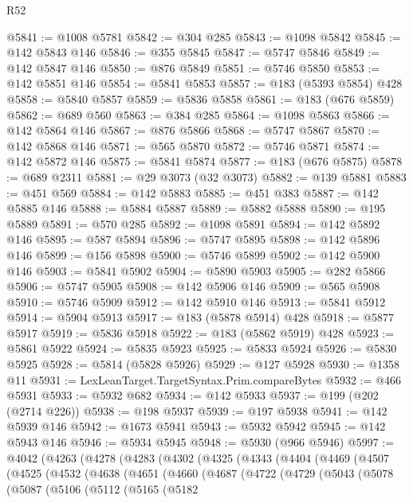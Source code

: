 \begin{lexlean}{R52}
\begin{coremodule}
@5841 := @1008 @5781
@5842 := @304 @285
@5843 := @1098 @5842
@5845 := @142 @5843 @146
@5846 := @355 @5845
@5847 := @5747 @5846
@5849 := @142 @5847 @146
@5850 := @876 @5849
@5851 := @5746 @5850
@5853 := @142 @5851 @146
@5854 := @5841 @5853
@5857 := @183 (@5393 @5854) @428
@5858 := @5840 @5857
@5859 := @5836 @5858
@5861 := @183 (@676 @5859)
@5862 := @689 @560
@5863 := @384 @285
@5864 := @1098 @5863
@5866 := @142 @5864 @146
@5867 := @876 @5866
@5868 := @5747 @5867
@5870 := @142 @5868 @146
@5871 := @565 @5870
@5872 := @5746 @5871
@5874 := @142 @5872 @146
@5875 := @5841 @5874
@5877 := @183 (@676 @5875)
@5878 := @689 @2311
@5881 := @29 @3073 (@32 @3073)
@5882 := @139 @5881
@5883 := @451 @569
@5884 := @142 @5883
@5885 := @451 @383
@5887 := @142 @5885 @146
@5888 := @5884 @5887
@5889 := @5882 @5888
@5890 := @195 @5889
@5891 := @570 @285
@5892 := @1098 @5891
@5894 := @142 @5892 @146
@5895 := @587 @5894
@5896 := @5747 @5895
@5898 := @142 @5896 @146
@5899 := @156 @5898
@5900 := @5746 @5899
@5902 := @142 @5900 @146
@5903 := @5841 @5902
@5904 := @5890 @5903
@5905 := @282 @5866
@5906 := @5747 @5905
@5908 := @142 @5906 @146
@5909 := @565 @5908
@5910 := @5746 @5909
@5912 := @142 @5910 @146
@5913 := @5841 @5912
@5914 := @5904 @5913
@5917 := @183 (@5878 @5914) @428
@5918 := @5877 @5917
@5919 := @5836 @5918
@5922 := @183 (@5862 @5919) @428
@5923 := @5861 @5922
@5924 := @5835 @5923
@5925 := @5833 @5924
@5926 := @5830 @5925
@5928 := @5814 (@5828 @5926)
@5929 := @127 @5928
@5930 := @1358 @11
@5931 := LexLeanTarget.TargetSyntax.Prim.compareBytes
@5932 := @466 @5931
@5933 := @5932 @682
@5934 := @142 @5933
@5937 := @199 (@202 (@2714 @226))
@5938 := @198 @5937
@5939 := @197 @5938
@5941 := @142 @5939 @146
@5942 := @1673 @5941
@5943 := @5932 @5942
@5945 := @142 @5943 @146
@5946 := @5934 @5945
@5948 := @5930 (@966 @5946)
@5997 := @4042
    (@4263
      (@4278
        (@4283
          (@4302
            (@4325
              (@4343
                (@4404
                  (@4469
                    (@4507
                      (@4525
                        (@4532
                          (@4638
                            (@4651
                              (@4660
                                (@4687
                                  (@4722
                                    (@4729
                                      (@5043
                                        (@5078
                                          (@5087
                                            (@5106
                                              (@5112
                                                (@5165
                                                  (@5182

\end{coremodule}
\end{lexlean}
